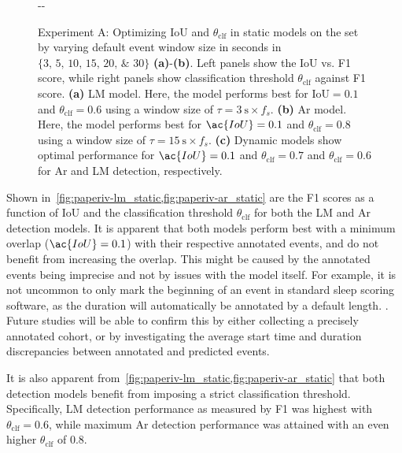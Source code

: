 \begin{figure}
\begin{adjustwidth*}{}{-\marginparwidth-\marginparsep}
    \caption[Experiment A results]{Experiment A: Optimizing \ac{IoU} and $\theta_{\mathrm{clf}}$ in static models on the \eval set by varying default event window size in seconds in $\lbrace \numlist[list-final-separator={, }]{3;5;10;15;20;30} \rbrace$ \textbf{(a)}-\textbf{(b)}. Left panels show the \ac{IoU} vs. F1 score, while right panels show classification threshold $\theta_{\mathrm{clf}}$ against F1 score. \textbf{(a)} \ac{LM} model. Here, the model performs best for $\mathrm{IoU}=\num{0.1}$ and $\theta_{\mathrm{clf}} = \num{0.6}$ using a window size of $\tau=\SI{3}{\second}\times f_{s}$. \textbf{(b)} \ac{Ar} model. Here, the model performs best for $\ac{IoU}=\num{0.1}$ and $\theta_{\mathrm{clf}} = \num{0.8}$ using a window size of $\tau=\SI{15}{\second} \times f_{s}$. \textbf{(c)} Dynamic models show optimal performance for $\ac{IoU}=\num{0.1}$ and $\theta_{\mathrm{clf}}=\num{0.7}$ and $\theta_{\mathrm{clf}}=\num{0.6}$ for \ac{Ar} and \ac{LM} detection, respectively.}
    \label{fig:paperiv-experiment_a}
    \end{adjustwidth*}
\end{figure}

Shown in~\cref{fig:paperiv-lm_static,fig:paperiv-ar_static} are the F1 scores as a function of \ac{IoU} and the classification threshold $\theta_{\mathrm{clf}}$ for both the \ac{LM} and \ac{Ar} detection models. 
It is apparent that both models perform best with a minimum overlap ($\ac{IoU} = \num{0.1}$) with their respective annotated events, and do not benefit from increasing the overlap. 
This might be caused by the annotated events being imprecise and not by issues with the model itself. 
For example, it is not uncommon to only mark the beginning of an event in standard sleep scoring software, as the duration will automatically be annotated by a default length. . 
Future studies will be able to confirm this by either collecting a precisely annotated cohort, or by investigating the average start time and duration discrepancies between annotated and predicted events. 

It is also apparent from~\cref{fig:paperiv-lm_static,fig:paperiv-ar_static} that both detection models benefit from imposing a strict classification threshold. 
Specifically, \ac{LM} detection performance as measured by F1 was highest with $\theta_{\mathrm{clf}} = \num{0.6}$, while maximum \ac{Ar} detection performance was attained with an even higher $\theta_{\mathrm{clf}}$ of \num{0.8}.

